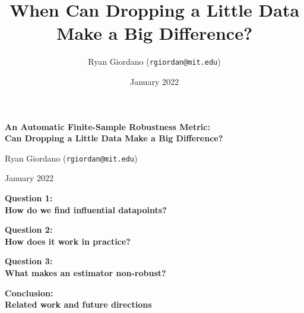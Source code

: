 \documentclass[10pt]{beamer}
\title{When Can Dropping a Little Data Make a Big Difference?}
\author{Ryan Giordano (\texttt{rgiordan@mit.edu})}
\date{January 2022}
\begin{document}

\begin{frame}

\begin{center}
\large
\textbf{
An Automatic Finite-Sample Robustness Metric:
\\Can Dropping a Little Data Make a Big Difference?}
\end{center}

\hrulefill

Ryan Giordano (\texttt{rgiordan@mit.edu})\footnotemark[1]

January 2022


\end{frame}



\begin{frame}{}

{\Large \textbf{Question 1:} \\ \vspace{0.5em}
\textbf{How do we find influential datapoints?}}

\end{frame}



\begin{frame}{}

{\Large \textbf{Question 2:} \\ \vspace{0.5em}
\textbf{How does it work in practice?}}

\end{frame}



\begin{frame}{}

{\Large \textbf{Question 3:} \\ \vspace{0.5em}
\textbf{What makes an estimator non-robust?}}

\end{frame}



\begin{frame}{}

{\Large \textbf{Conclusion: \\Related work and future directions} }

\end{frame}
\end{document}
